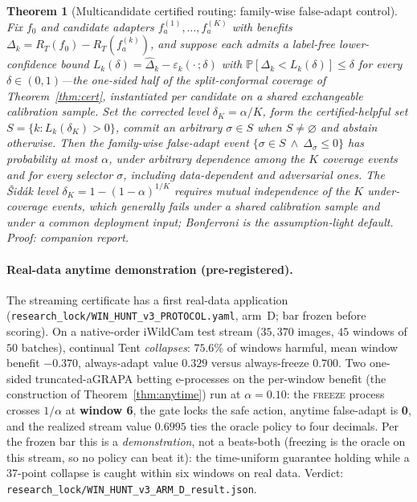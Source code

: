 \documentclass[conference]{IEEEtran}
\theoremstyle{plain}
\newtheorem{theorem}{Theorem}
\theoremstyle{definition}
\renewcommand{\Pr}{\mathbb{P}}
\begin{document}
\begin{theorem}[Multicandidate certified routing: family-wise false-adapt control]\label{thm:multicand}
Fix $f_0$ and candidate adapters $f_a^{(1)},\dots,f_a^{(K)}$ with benefits
$\Delta_k=R_T(f_0)-R_T(f_a^{(k)})$, and suppose each admits a label-free lower-confidence bound
$L_k(\delta)=\widehat\Delta_k-\varepsilon_k(\cdot\,;\delta)$ with $\Pr[\Delta_k<L_k(\delta)]\le\delta$
for every $\delta\in(0,1)$---the one-sided half of the split-conformal coverage of
Theorem~\ref{thm:cert}, instantiated per candidate on a shared exchangeable calibration sample. Set
the corrected level $\delta_K=\alpha/K$, form the certified-helpful set $S=\{k:L_k(\delta_K)>0\}$,
commit an arbitrary $\sigma\in S$ when $S\neq\varnothing$ and abstain otherwise. Then the
family-wise false-adapt event $\{\sigma\in S\ \wedge\ \Delta_\sigma\le0\}$ has probability at most
$\alpha$, under arbitrary dependence among the $K$ coverage events and for \emph{every} selector
$\sigma$, including data-dependent and adversarial ones. The \v{S}id\'ak level
$\delta_K=1-(1-\alpha)^{1/K}$ requires mutual independence of the $K$ under-coverage events, which
generally fails under a shared calibration sample and under a common deployment input; Bonferroni is
the assumption-light default. \emph{Proof: companion report.}
\end{theorem}

\paragraph{Real-data anytime demonstration (pre-registered).} The streaming certificate has a
first real-data application (\texttt{research\_lock/WIN\_HUNT\_v3\_PROTOCOL.yaml}, arm~D; bar
frozen before scoring). On a native-order iWildCam test stream ($35{,}370$ images, $45$ windows
of $50$ batches), continual Tent \emph{collapses}: $75.6\%$ of windows harmful, mean window
benefit $-0.370$, always-adapt value $0.329$ versus always-freeze $0.700$. Two one-sided
truncated-aGRAPA betting e-processes on the per-window benefit (the construction of
Theorem~\ref{thm:anytime}) run at $\alpha{=}0.10$: the \textsc{freeze} process crosses
$1/\alpha$ at \textbf{window 6}, the gate locks the safe action, anytime false-adapt is
\textbf{0}, and the realized stream value $0.6995$ ties the oracle policy to four decimals. Per
the frozen bar this is a \emph{demonstration}, not a beats-both (freezing is the oracle on this
stream, so no policy can beat it): the time-uniform guarantee holding while a $37$-point
collapse is caught within six windows on real data. Verdict:
\texttt{research\_lock/WIN\_HUNT\_v3\_ARM\_D\_result.json}.
\end{document}
